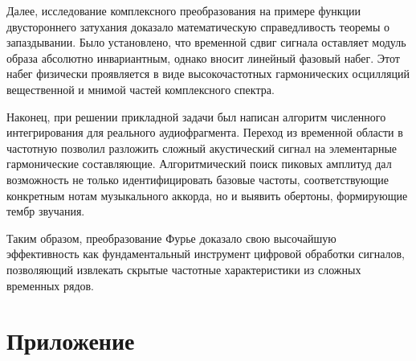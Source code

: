 \documentclass[a4paper,14pt]{extarticle}
\begin{document}
Далее, исследование комплексного преобразования на примере функции двустороннего 
затухания доказало математическую справедливость теоремы о запаздывании. 
Было установлено, что временной сдвиг сигнала оставляет модуль образа абсолютно инвариантным, 
однако вносит линейный фазовый набег. Этот набег физически проявляется в виде 
высокочастотных гармонических осцилляций вещественной и мнимой частей комплексного спектра.

Наконец, при решении прикладной задачи был написан алгоритм 
численного интегрирования для реального аудиофрагмента. Переход из временной области 
в частотную позволил разложить сложный акустический сигнал на 
элементарные гармонические составляющие. Алгоритмический поиск пиковых амплитуд 
дал возможность не только идентифицировать базовые частоты, соответствующие конкретным 
нотам музыкального аккорда, но и выявить обертоны, формирующие тембр звучания.

Таким образом, преобразование Фурье доказало свою высочайшую эффективность как 
фундаментальный инструмент цифровой обработки сигналов, позволяющий извлекать 
скрытые частотные характеристики из сложных временных рядов.

\newpage

\section{Приложение}








\end{document}
